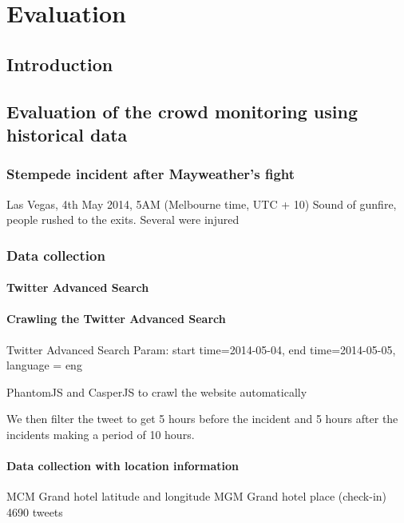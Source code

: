 \chapter{Evaluation}
\label{ch:eval}
\ifpdf
    \graphicspath{{Chapter5/Figs/Raster/}{Chapter5/Figs/PDF/}{Chapter5/Figs/}}
\else
    \graphicspath{{Chapter5/Figs/Vector/}{Chapter5/Figs/}}
\fi

\section{Introduction}

\section{Evaluation of the crowd monitoring using historical data}

\subsection{Stempede incident after Mayweather's fight}
Las Vegas, 4th May 2014, 5AM (Melbourne time, UTC + 10) 
Sound of gunfire, people rushed to the exits. Several were injured

\subsection{Data collection}

\subsubsection{Twitter Advanced Search}

\subsubsection{Crawling the Twitter Advanced Search}
Twitter Advanced Search
Param: start time=2014-05-04, end time=2014-05-05, language = eng

PhantomJS and CasperJS to crawl the website automatically

We then filter the tweet to get 5 hours before the incident and 5 hours after the incidents making a period of 10 hours.
\subsubsection{Data collection with location information}
MCM Grand hotel latitude and longitude
MGM Grand hotel place (check-in)
4690 tweets
